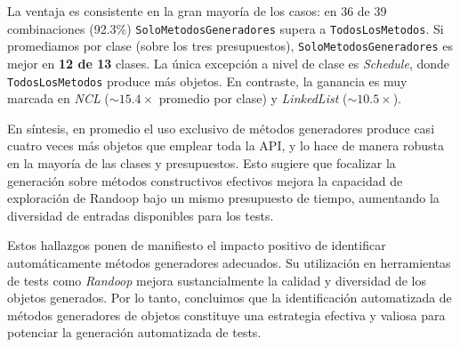 La ventaja es consistente en la gran mayoría de los casos: en 36 de 39
combinaciones (92.3\%) \texttt{SoloMetodosGeneradores} supera a \texttt{TodosLosMetodos}. Si
promediamos por clase (sobre los tres presupuestos), \texttt{SoloMetodosGeneradores} es mejor
en \textbf{12 de 13} clases. La única excepción a nivel de clase es
\emph{Schedule}, donde \texttt{TodosLosMetodos} produce más objetos. En contraste, la ganancia es muy marcada en
\emph{NCL} (\(\sim 15.4\times\) promedio por clase) y \emph{LinkedList}
(\(\sim 10.5\times\)).

En síntesis, en promedio el uso exclusivo de métodos generadores
produce casi cuatro veces más objetos que emplear toda la API, y lo
hace de manera robusta en la mayoría de las clases y presupuestos. Esto sugiere
que focalizar la generación sobre métodos constructivos efectivos mejora la
capacidad de exploración de Randoop bajo un mismo presupuesto de tiempo,
aumentando la diversidad de entradas disponibles para los tests.

Estos hallazgos ponen de manifiesto el impacto positivo de identificar automáticamente métodos 
generadores adecuados. Su utilización en herramientas de tests como \emph{Randoop} mejora sustancialmente 
la calidad y diversidad de los objetos generados. Por lo tanto, concluimos que la identificación automatizada de métodos generadores de objetos 
constituye una estrategia efectiva y valiosa para potenciar la generación automatizada de tests.



